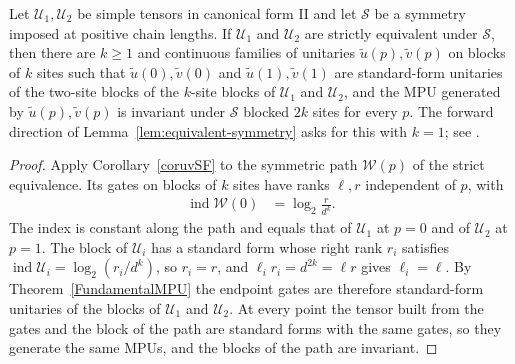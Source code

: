 \begin{lemma}
    \label{lem:mpu_symmetry_path_criterion_forward}
    \leanok
    Let $\mathcal U_1,\mathcal U_2$ be simple tensors in canonical form II and
    let $\mathcal S$ be a symmetry imposed at positive chain lengths. If
    $\mathcal U_1$ and $\mathcal U_2$ are strictly equivalent under
    $\mathcal S$, then there are $k\geq1$ and continuous families of unitaries
    $\widetilde u(p),\widetilde v(p)$ on blocks of $k$ sites such that
    $\widetilde u(0),\widetilde v(0)$ and $\widetilde u(1),\widetilde v(1)$ are
    standard-form unitaries of the two-site blocks of the $k$-site blocks of
    $\mathcal U_1$ and $\mathcal U_2$, and the MPU generated by
    $\widetilde u(p),\widetilde v(p)$ is invariant under $\mathcal S$ blocked
    $2k$ sites for every $p$. The forward direction of
    Lemma~\ref{lem:equivalent-symmetry} asks for this with $k=1$; see
    \cite{gap:mpu_symmetry_path_criterion_blocking}.
\end{lemma}

\begin{proof}
    \leanok
    Apply Corollary~\ref{coruvSF} to the symmetric path $\mathcal W(p)$ of the
    strict equivalence. Its gates on blocks of $k$ sites have ranks $\ell,r$
    independent of $p$, with
    \begin{align}
        \operatorname{ind}\mathcal W(0) & =\log_2\frac{r}{d^k}.
    \end{align}
    The index is constant along the path and equals that of $\mathcal U_1$ at
    $p=0$ and of $\mathcal U_2$ at $p=1$. The block of $\mathcal U_i$ has a
    standard form whose right rank $r_i$ satisfies
    $\operatorname{ind}\mathcal U_i=\log_2(r_i/d^k)$, so $r_i=r$, and
    $\ell_ir_i=d^{2k}=\ell r$ gives $\ell_i=\ell$. By
    Theorem~\ref{FundamentalMPU} the endpoint gates are therefore
    standard-form unitaries of the blocks of $\mathcal U_1$ and
    $\mathcal U_2$. At every point the tensor built from the gates and the
    block of the path are standard forms with the same gates, so they
    generate the same MPUs, and the blocks of the path are invariant.
\end{proof}

